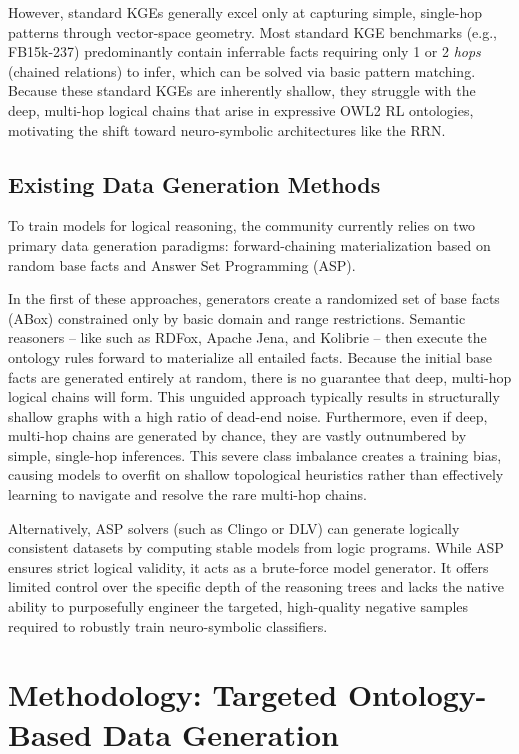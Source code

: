 \documentclass{IOS-Book-Article}     %
\begin{document}
However, standard KGEs generally excel only at capturing simple, single-hop patterns through vector-space geometry. Most standard KGE benchmarks (e.g., FB15k-237) predominantly contain inferrable facts requiring only 1 or 2 \textit{hops} (chained relations) to infer, which can be solved via basic pattern matching. Because these standard KGEs are inherently shallow, they struggle with the deep, multi-hop logical chains that arise in expressive OWL2 RL ontologies, motivating the shift toward neuro-symbolic architectures like the RRN.

\subsection{Existing Data Generation Methods}
To train models for logical reasoning, the community currently relies on two primary data generation paradigms: forward-chaining materialization based on random base facts and Answer Set Programming (ASP).

In the first of these approaches, generators create a randomized set of base facts (ABox) constrained only by basic domain and range restrictions. Semantic reasoners -- like such as RDFox, Apache Jena, and Kolibrie -- then execute the ontology rules forward to materialize all entailed facts. Because the initial base facts are generated entirely at random, there is no guarantee that deep, multi-hop logical chains will form. This unguided approach typically results in structurally shallow graphs with a high ratio of dead-end noise. Furthermore, even if deep, multi-hop chains are generated by chance, they are vastly outnumbered by simple, single-hop inferences. This severe class imbalance creates a training bias, causing models to overfit on shallow topological heuristics rather than effectively learning to navigate and resolve the rare multi-hop chains.

Alternatively, ASP solvers (such as Clingo or DLV) can generate logically consistent datasets by computing stable models from logic programs. While ASP ensures strict logical validity, it acts as a brute-force model generator. It offers limited control over the specific depth of the reasoning trees and lacks the native ability to purposefully engineer the targeted, high-quality negative samples required to robustly train neuro-symbolic classifiers.

\section{Methodology: Targeted Ontology-Based Data Generation}
\label{ch:methodology}
\end{document}
